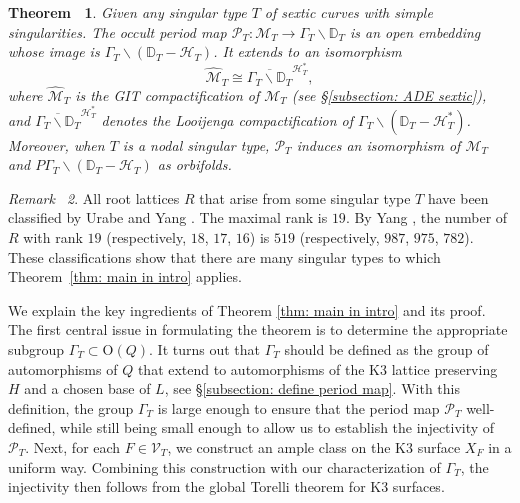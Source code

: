 \documentclass[
]{article}
\begin{document}
\textbf{Theorem~ 1}. \emph{\label{thm: main in intro} Given any singular
type \(T\) of sextic curves with simple singularities. The occult period
map
\(\mathscr{P}_T\colon \mathcal{M}_T \to \Gamma_{T}\backslash \mathbb{D}_T\)
is an open embedding whose image is
\(\Gamma_T\backslash(\mathbb{D}_T-\mathcal{H}_T)\). It extends to an
isomorphism
\[\widehat{\mathcal{M}}_T \cong \overline{\Gamma_T \backslash \mathbb{D}_T}^{\mathcal{H}_T^*},\]
where \(\widehat{\mathcal{M}}_T\) is the GIT compactification of
\(\mathcal{M}_T\) (see §\ref{subsection: ADE sextic}), and
\(\overline{\Gamma_T \backslash \mathbb{D}_T}^{\mathcal{H}_T^*}\)
denotes the Looijenga compactification of
\(\Gamma_T \backslash (\mathbb{D}_T - \mathcal{H}_T^*)\). Moreover, when
\(T\) is a nodal singular type, \(\mathscr{P}_T\) induces an isomorphism
of \(\mathcal{M}_T\) and
\(P\Gamma_T\backslash(\mathbb{D}_T-\mathcal{H}_T)\) as orbifolds.}

\emph{Remark~ 2}. All root lattices \(R\) that arise from some singular
type \(T\) have been classified by Urabe \cite{urabe1988combinations}
and Yang \cite{yang1996sextic}. The maximal rank is \(19\). By Yang
\cite[Thm 2.1]{yang1996sextic}, the number of \(R\) with rank \(19\)
(respectively, \(18\), \(17\), \(16\)) is \(519\) (respectively,
\(987\), \(975\), \(782\)). These classifications show that there are
many singular types to which Theorem~\ref{thm: main in intro} applies.

We explain the key ingredients of Theorem \ref{thm: main in intro} and
its proof. The first central issue in formulating the theorem is to
determine the appropriate subgroup \(\Gamma_T \subset \mathrm{O}(Q)\).
It turns out that \(\Gamma_T\) should be defined as the group of
automorphisms of \(Q\) that extend to automorphisms of the K3 lattice
preserving \(H\) and a chosen base of \(L\), see
§\ref{subsection: define period map}. With this definition, the group
\(\Gamma_T\) is large enough to ensure that the period map
\(\mathscr{P}_T\) well-defined, while still being small enough to allow
us to establish the injectivity of \(\mathscr{P}_T\). Next, for each
\(F\in\mathcal{V}_T\), we construct an ample class on the K3 surface
\(X_F\) in a uniform way. Combining this construction with our
characterization of \(\Gamma_T\), the injectivity then follows from the
global Torelli theorem for K3 surfaces.
\end{document}
